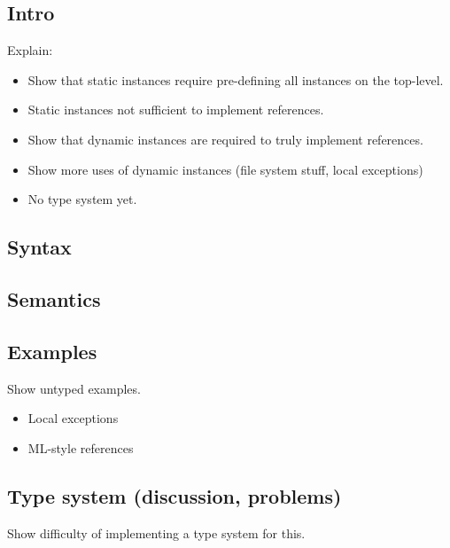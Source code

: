 {\subsection{Intro}
Explain:
\begin{itemize}
	\item Show that static instances require pre-defining all instances on the top-level.
	\item Static instances not sufficient to implement references.
	\item Show that dynamic instances are required to truly implement references.
	\item Show more uses of dynamic instances (file system stuff, local exceptions)
	\item No type system yet.
\end{itemize}

\subsection{Syntax}

\subsection{Semantics}

\subsection{Examples}
Show untyped examples.
\begin{itemize}
	\item Local exceptions
	\item ML-style references
\end{itemize}

\subsection{Type system (discussion, problems)}
Show difficulty of implementing a type system for this.
}